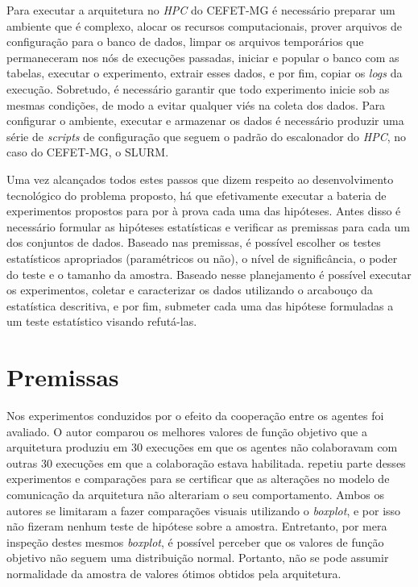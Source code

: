 
Para executar a arquitetura no \textit{HPC} do CEFET-MG é necessário preparar um ambiente que é complexo, alocar os recursos computacionais, prover arquivos de configuração para o banco de dados, limpar os arquivos temporários que permaneceram nos nós de execuções passadas, iniciar e popular o banco com as tabelas, executar o experimento, extrair esses dados, e por fim, copiar os \textit{logs} da execução. Sobretudo, é necessário garantir que todo experimento inicie sob as mesmas condições, de modo a evitar qualquer viés na coleta dos dados. Para configurar o ambiente, executar e armazenar os dados é necessário produzir uma série de \textit{scripts} de configuração que seguem o padrão do escalonador do \textit{HPC}, no caso do CEFET-MG, o SLURM.

Uma vez alcançados todos estes passos que dizem respeito ao desenvolvimento tecnológico do problema proposto, há que efetivamente executar a bateria de experimentos propostos para por à prova cada uma das hipóteses. Antes disso é necessário formular as hipóteses estatísticas e verificar as premissas para cada um dos conjuntos de dados. Baseado nas premissas, é possível escolher os testes estatísticos apropriados (paramétricos ou não), o nível de significância, o poder do teste e o tamanho da amostra. Baseado nesse planejamento é possível executar os experimentos, coletar e caracterizar os dados utilizando o arcabouço da estatística descritiva, e por fim, submeter cada uma das hipótese formuladas a um teste estatístico visando refutá-las. 

\section{Premissas}
\label{sec:premissas}
Nos experimentos conduzidos por   o efeito da cooperação entre os agentes foi avaliado. O autor comparou os melhores valores de função objetivo que a arquitetura produziu em 30 execuções em que os agentes não colaboravam com outras 30 execuções em que a colaboração estava habilitada.  repetiu parte desses experimentos e comparações para se certificar que as alterações no modelo de comunicação da arquitetura não alterariam o seu comportamento. Ambos os autores se limitaram a fazer comparações visuais utilizando o \textit{boxplot}, e por isso não fizeram nenhum teste de hipótese sobre a amostra. Entretanto, por mera inspeção destes mesmos \textit{boxplot}, é possível perceber que os valores de função objetivo não seguem uma distribuição normal. Portanto, não se pode assumir normalidade da amostra de valores ótimos obtidos pela arquitetura.

